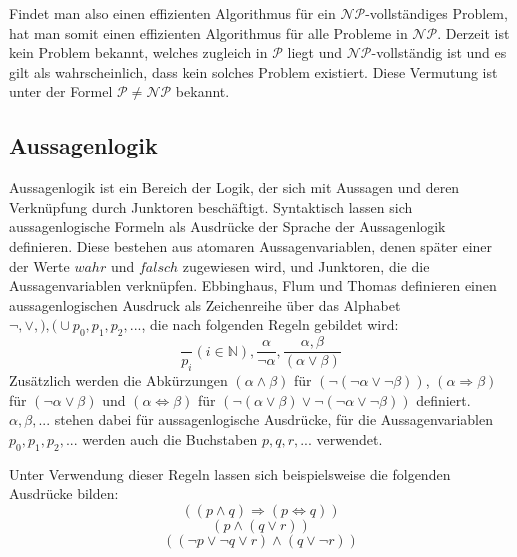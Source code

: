 \documentclass[conference,compsoc,final,a4paper]{IEEEtran}
\begin{document}
Findet man also einen effizienten Algorithmus für ein $\mathcal{NP}$-vollständiges Problem, hat man somit einen effizienten Algorithmus für alle Probleme in $\mathcal{NP}$. Derzeit ist kein Problem bekannt, welches zugleich in $\mathcal{P}$ liegt und $\mathcal{NP}$-vollständig ist und es gilt als wahrscheinlich, dass kein solches Problem existiert. Diese Vermutung ist unter der Formel $\mathcal{P} \neq \mathcal{NP}$ bekannt. \cites{theory_of_computing,handbook_theoretical_computer_science}

\subsection{Aussagenlogik}
Aussagenlogik ist ein Bereich der Logik, der sich mit Aussagen und deren Verknüpfung durch Junktoren beschäftigt. Syntaktisch lassen sich aussagenlogische Formeln als Ausdrücke der Sprache der Aussagenlogik definieren. Diese bestehen aus atomaren Aussagenvariablen, denen später einer der Werte $wahr$ und $falsch$ zugewiesen wird, und Junktoren, die die Aussagenvariablen verknüpfen. Ebbinghaus, Flum und Thomas \cite{logik_ebbinghaus} definieren einen aussagenlogischen Ausdruck als Zeichenreihe über das Alphabet ${\neg,\lor,),(} \cup {p_0,p_1,p_2,...}$, die nach folgenden Regeln gebildet wird:
\begin{equation}
  \frac{}{p_i} (i \in \mathbb{N}), \frac{\alpha}{\neg \alpha}, \frac{\alpha, \beta}{(\alpha \lor \beta)}
\end{equation}
Zusätzlich werden die Abkürzungen $(\alpha \land \beta)$ für $(\neg (\neg \alpha \lor \neg \beta))$, $(\alpha \Rightarrow \beta)$ für $(\neg \alpha \lor \beta)$ und $(\alpha \Leftrightarrow \beta)$ für $(\neg (\alpha \lor \beta) \lor \neg (\neg \alpha \lor \neg \beta))$ definiert.
$\alpha, \beta, ...$ stehen dabei für aussagenlogische Ausdrücke, für die Aussagenvariablen $p_0, p_1, p_2, ...$ werden auch die Buchstaben $p, q, r, ...$ verwendet. \cite{logik_ebbinghaus}

Unter Verwendung dieser Regeln lassen sich beispielsweise die folgenden Ausdrücke bilden:
\begin{equation}
  ((p \land q) \Rightarrow (p \Leftrightarrow q))
\end{equation}
\begin{equation}
  (p \land (q \lor r))
\end{equation}
\begin{equation}
  ((\neg p \lor \neg q \lor r) \land (q \lor \neg r))
\end{equation}
\end{document}
